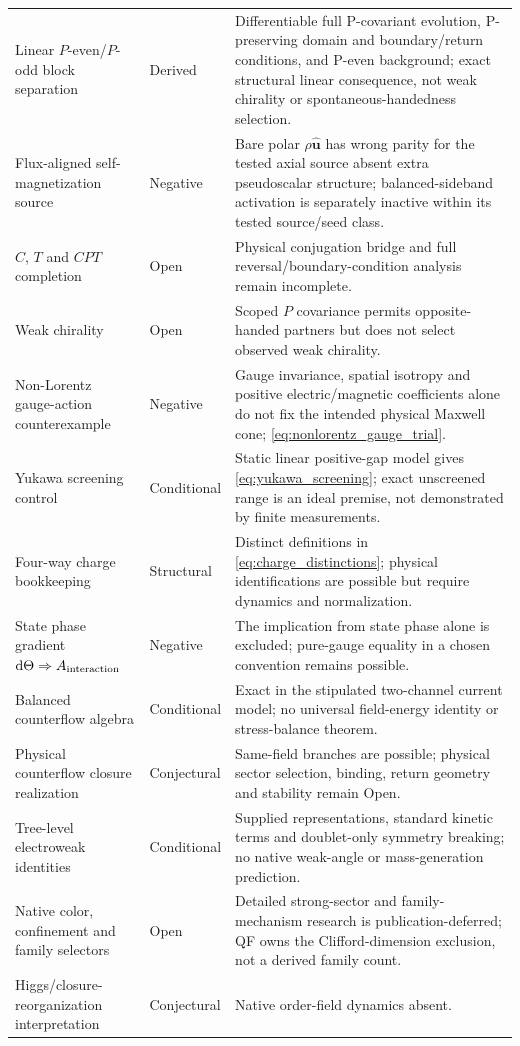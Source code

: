 \documentclass[11pt]{article}
\theoremstyle{definition}
\newcommand{\dd}{\mathrm{d}}
\begin{document}
\begin{longtable}{>{\raggedright\arraybackslash}p{}
                  >{\raggedright\arraybackslash}p{}
                  >{\raggedright\arraybackslash}p{}}
Linear $P$-even/$P$-odd block separation & Derived & Differentiable full P-covariant evolution, P-preserving domain and boundary/return conditions, and P-even background; exact structural linear consequence, not weak chirality or spontaneous-handedness selection.\\
Flux-aligned self-magnetization source & Negative & Bare polar $\rho\hat{\mathbf u}$ has wrong parity for the tested axial source absent extra pseudoscalar structure; balanced-sideband activation is separately inactive within its tested source/seed class.\\
$C$, $T$ and $CPT$ completion & Open & Physical conjugation bridge and full reversal/boundary-condition analysis remain incomplete.\\
Weak chirality & Open & Scoped $P$ covariance permits opposite-handed partners but does not select observed weak chirality.\\
Non-Lorentz gauge-action counterexample & Negative & Gauge invariance, spatial isotropy and positive electric/magnetic coefficients alone do not fix the intended physical Maxwell cone; \cref{eq:nonlorentz_gauge_trial}.\\
Yukawa screening control & Conditional & Static linear positive-gap model gives \cref{eq:yukawa_screening}; exact unscreened range is an ideal premise, not demonstrated by finite measurements.\\
Four-way charge bookkeeping & Structural & Distinct definitions in \cref{eq:charge_distinctions}; physical identifications are possible but require dynamics and normalization.\\
State phase gradient $\dd\Theta\Rightarrow A_{\rm interaction}$ & Negative & The implication from state phase alone is excluded; pure-gauge equality in a chosen convention remains possible.\\
Balanced counterflow algebra & Conditional & Exact in the stipulated two-channel current model; no universal field-energy identity or stress-balance theorem.\\
Physical counterflow closure realization & Conjectural & Same-field branches are possible; physical sector selection, binding, return geometry and stability remain Open.\\
Tree-level electroweak identities & Conditional & Supplied representations, standard kinetic terms and doublet-only symmetry breaking; no native weak-angle or mass-generation prediction.\\
Native color, confinement and family selectors & Open & Detailed strong-sector and family-mechanism research is publication-deferred; QF owns the Clifford-dimension exclusion, not a derived family count.\\
Higgs/closure-reorganization interpretation & Conjectural & Native order-field dynamics absent.\\
\bottomrule
\end{longtable}
\normalsize
\end{document}
